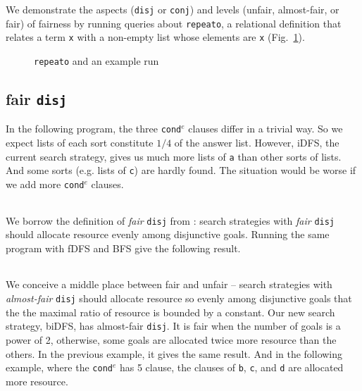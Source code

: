 \documentclass[format=acmlarge, review=true, authordraft=true]{acmart}
\newcommand{\conde}{\texttt{cond$^e$} }
\newcommand{\conj}{\texttt{conj}}
\newcommand{\disj}{\texttt{disj}}
\begin{document}
We demonstrate the aspects (\disj{} or \conj{}) and levels (unfair, 
almost-fair, or fair) of fairness by running queries about \texttt{repeato}, a 
relational definition that relates a term \texttt{x} with a non-empty list 
whose elements are \texttt{x} (Fig.~\ref{repeato}).

\begin{figure}
	
	\caption{\texttt{repeato} and an example run}
	\label{repeato}
\end{figure}

\subsection{fair \texttt{disj}}

In the following program, the three \conde clauses differ in a trivial way. So 
we expect lists of each sort constitute $1/4$ of the answer list. However, 
iDFS, the current search strategy, gives us much more lists of \texttt{a} than 
other sorts of lists. And some sorts (e.g. lists of \texttt{c}) are hardly 
found. The situation would be worse if we add more \conde clauses.

\begin{center}
	\begin{tabular}{c}
		
	\end{tabular}
\end{center}

We borrow the definition of \emph{fair} \disj{} from \cite{seres1999algebra}: 
search strategies with \emph{fair} \disj{} should allocate resource evenly 
among disjunctive goals. Running the same program with fDFS and BFS give the 
following result. 

\begin{center}
	\begin{tabular}{c}
		
	\end{tabular}
\end{center}

We conceive a middle place between fair and unfair -- search strategies with 
\emph{almost-fair} \disj{} should allocate resource so evenly among disjunctive 
goals\citep{seres1999algebra} that the the maximal ratio of resource is bounded 
by a constant. Our new search strategy, biDFS, has almost-fair \disj{}. It is 
fair when the number of goals is a power of 2, otherwise, some goals are 
allocated twice more resource than the others. In the previous example, it 
gives the same result. And in the following example, where the \conde has 5 
clause, the clauses of \texttt{b}, \texttt{c}, and \texttt{d} are allocated 
more resource.
\end{document}
